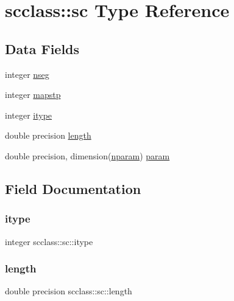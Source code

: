 \hypertarget{structscclass_1_1sc}{}\section{scclass\+::sc Type Reference}
\label{structscclass_1_1sc}
\subsection*{Data Fields}
\begin{DoxyCompactItemize}
\item 
integer \mbox{\hyperlink{structscclass_1_1sc_a32cf6178c767aecb2b10b7baa0221c78}{nseg}}
\item 
integer \mbox{\hyperlink{structscclass_1_1sc_ac919c69cd2bb089386f56a5ac75728f0}{mapstp}}
\item 
integer \mbox{\hyperlink{structscclass_1_1sc_a4ddd6baf3b915cf7ff25830e84ce6e75}{itype}}
\item 
double precision \mbox{\hyperlink{structscclass_1_1sc_ae9c1bce2c31838e6ec98bdbfe04cb6d7}{length}}
\item 
double precision, dimension(\mbox{\hyperlink{namespacescclass_a78eec9a89964d83818db291873df4436}{nparam}}) \mbox{\hyperlink{structscclass_1_1sc_a21e20d06bda8473fab959e3ee29e5183}{param}}
\end{DoxyCompactItemize}


\subsection{Field Documentation}
\mbox{\label{structscclass_1_1sc_a4ddd6baf3b915cf7ff25830e84ce6e75}} 
\subsubsection{\texorpdfstring{itype}{itype}}
{\footnotesize\ttfamily integer scclass\+::sc\+::itype}

\mbox{\label{structscclass_1_1sc_ae9c1bce2c31838e6ec98bdbfe04cb6d7}} 
\subsubsection{\texorpdfstring{length}{length}}
{\footnotesize\ttfamily double precision scclass\+::sc\+::length}

